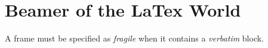\section{Beamer of the LaTex World}
A frame must be specified as \textit{fragile} when it contains a
\textit{verbatim} block.
